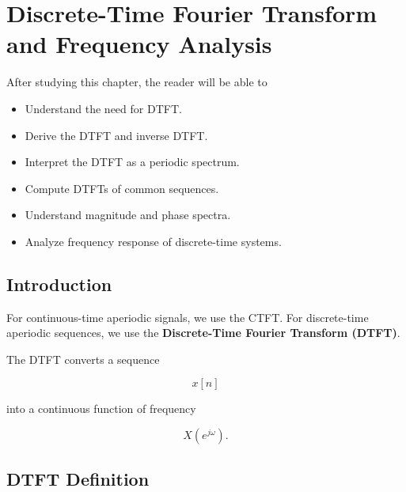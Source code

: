 
\chapter{Discrete-Time Fourier Transform and Frequency Analysis}

\begin{tcolorbox}[colback=blue!5!white,colframe=blue!70!black,title=Learning Objectives]

After studying this chapter, the reader will be able to

\begin{itemize}
\item Understand the need for DTFT.
\item Derive the DTFT and inverse DTFT.
\item Interpret the DTFT as a periodic spectrum.
\item Compute DTFTs of common sequences.
\item Understand magnitude and phase spectra.
\item Analyze frequency response of discrete-time systems.
\end{itemize}

\end{tcolorbox}


\section{Introduction}

For continuous-time aperiodic signals, we use the CTFT. For discrete-time
aperiodic sequences, we use the \textbf{Discrete-Time Fourier Transform (DTFT)}.

The DTFT converts a sequence

\[
x[n]
\]

into a continuous function of frequency

\[
X(e^{j\omega}).
\]


\section{DTFT Definition}

